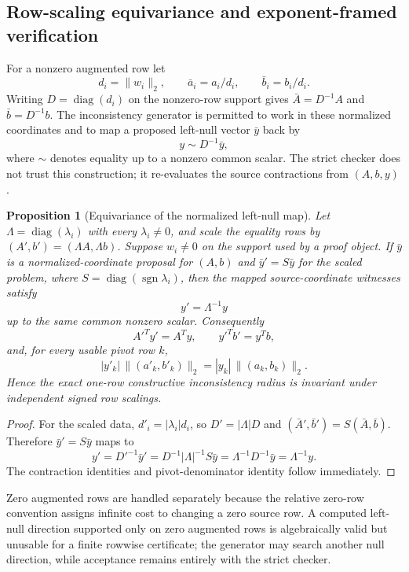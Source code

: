 \documentclass[11pt]{article}
\newtheorem{proposition}[theorem]{Proposition}
\theoremstyle{definition}
\begin{document}
\subsection{Row-scaling equivariance and exponent-framed verification}\label{sec:certificate-scaling}
For a nonzero augmented row let
\[
 d_i=\|w_i\|_2,\qquad
 \bar a_i=a_i/d_i,\qquad
 \bar b_i=b_i/d_i.
\]
Writing $D=\operatorname{diag}(d_i)$ on the nonzero-row support gives $\bar A=D^{-1}A$ and $\bar b=D^{-1}b$. The inconsistency generator is permitted to work in these normalized coordinates and to map a proposed left-null vector $\bar y$ back by
\[
 y\sim D^{-1}\bar y,
\]
where $\sim$ denotes equality up to a nonzero common scalar. The strict checker does not trust this construction; it re-evaluates the source contractions from $(A,b,y)$.

\begin{proposition}[Equivariance of the normalized left-null map]\label{prop:row-scaling-equivariance}
Let $\Lambda=\operatorname{diag}(\lambda_i)$ with every $\lambda_i\ne0$, and scale the equality rows by $(A',b')=(\Lambda A,\Lambda b)$. Suppose $w_i\ne0$ on the support used by a proof object. If $\bar y$ is a normalized-coordinate proposal for $(A,b)$ and $\bar y'=S\bar y$ for the scaled problem, where $S=\operatorname{diag}(\operatorname{sgn}\lambda_i)$, then the mapped source-coordinate witnesses satisfy
\[
 y'=\Lambda^{-1}y
\]
up to the same common nonzero scalar. Consequently
\[
 A'^Ty'=A^Ty,\qquad y'^Tb'=y^Tb,
\]
and, for every usable pivot row $k$,
\[
 |y'_k|\,\|(a'_k,b'_k)\|_2
 =|y_k|\,\|(a_k,b_k)\|_2.
\]
Hence the exact one-row constructive inconsistency radius is invariant under independent signed row scalings.
\end{proposition}

\begin{proof}
For the scaled data, $d'_i=|\lambda_i|d_i$, so $D'=|\Lambda|D$ and $(\bar A',\bar b')=S(\bar A,\bar b)$. Therefore $\bar y'=S\bar y$ maps to
\[
 y'=D'^{-1}\bar y'=D^{-1}|\Lambda|^{-1}S\bar y
 =\Lambda^{-1}D^{-1}\bar y=\Lambda^{-1}y.
\]
The contraction identities and pivot-denominator identity follow immediately.
\end{proof}

Zero augmented rows are handled separately because the relative zero-row convention assigns infinite cost to changing a zero source row. A computed left-null direction supported only on zero augmented rows is algebraically valid but unusable for a finite rowwise certificate; the generator may search another null direction, while acceptance remains entirely with the strict checker.
\end{document}
